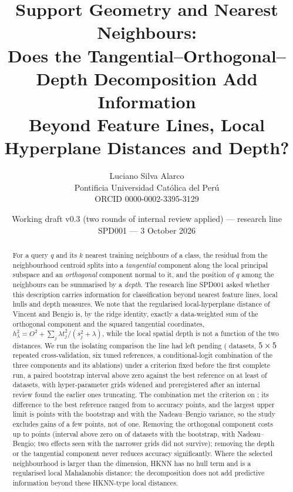 \documentclass[10pt,a4paper]{article}
\title{\textbf{Support Geometry and Nearest Neighbours:}\\[2pt]
\large Does the Tangential--Orthogonal--Depth Decomposition Add Information\\ Beyond Feature Lines, Local Hyperplane Distances and Depth?}
\author{Luciano Silva Alarco\\
\small Pontificia Universidad Cat\'olica del Per\'u\\
\small ORCID 0000-0002-3395-3129}
\date{\small Working draft v0.3 (two rounds of internal review applied) --- research line SPD001 --- 3 October 2026}
\theoremstyle{plain}
\theoremstyle{definition}
\theoremstyle{remark}
\begin{document}
\maketitle

\begin{abstract}
\noindent
For a query $q$ and its $k$ nearest training neighbours of a class, the residual from the neighbourhood centroid splits into a \emph{tangential} component along the local principal subspace and an \emph{orthogonal} component normal to it, and the position of $q$ among the neighbours can be summarised by a \emph{depth}. The research line SPD001 asked whether this description carries information for classification beyond nearest feature lines, local hulls and depth measures. We note that the regularised local-hyperplane distance of Vincent and Bengio is, by the ridge identity, exactly a data-weighted sum of the orthogonal component and the squared tangential coordinates, $h_\lambda^2=O^2+\sum_j \lambda t_j^2/(s_j^2+\lambda)$, while the local spatial depth is not a function of the two distances. We run the isolating comparison the line had left pending (\NDatasets{} datasets, $5\times5$ repeated cross-validation, six tuned references, a conditional-logit combination of the three components and its ablations) under a criterion fixed before the first complete run, a paired bootstrap interval above zero against the best reference on at least \NRequired{} of \NDatasets{} datasets, with hyper-parameter grids widened and preregistered after an internal review found the earlier ones truncating. The combination met the criterion on \NSigWins; its difference to the best reference ranged from \DeltaBestMin{} to \DeltaBestMax{} accuracy points, and the largest upper limit is \CiHiBestMax{} points with the bootstrap and \CiHiBestMaxNb{} with the Nadeau--Bengio variance, so the study excludes gains of a few points, not of one. Removing the orthogonal component costs up to \AblOrthMax{} points (interval above zero on \NAblOrthCiAboveZero{} of \NDatasets{} datasets with the bootstrap, \NAblOrthNbAboveZero{} with Nadeau--Bengio; two effects seen with the narrower grids did not survive); removing the depth or the tangential component never reduces accuracy significantly. Where the selected neighbourhood is larger than the dimension, HKNN has no hull term and is a regularised local Mahalanobis distance; the decomposition does not add predictive information beyond these HKNN-type local distances.
\end{abstract}
\end{document}
